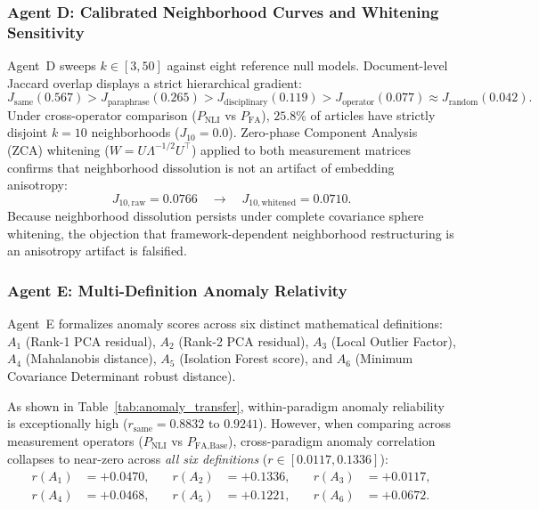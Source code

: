 \subsubsection{Agent D: Calibrated Neighborhood Curves and Whitening Sensitivity}

Agent~D sweeps $k \in [3, 50]$ against eight reference null models. Document-level Jaccard overlap displays a strict hierarchical gradient:
\begin{equation}
    J_{\text{same}} (0.567) > J_{\text{paraphrase}} (0.265) > J_{\text{disciplinary}} (0.119) > J_{\text{operator}} (0.077) \approx J_{\text{random}} (0.042).
\end{equation}
Under cross-operator comparison ($P_{\text{NLI}}$ vs $P_{\text{FA}}$), $25.8\%$ of articles have strictly disjoint $k=10$ neighborhoods ($J_{10} = 0.0$).
Zero-phase Component Analysis (ZCA) whitening ($W = U \Lambda^{-1/2} U^\top$) applied to both measurement matrices confirms that neighborhood dissolution is not an artifact of embedding anisotropy:
\begin{equation}
    J_{10,\text{raw}} = \mathbf{0.0766} \quad \longrightarrow \quad J_{10,\text{whitened}} = \mathbf{0.0710}.
\end{equation}
Because neighborhood dissolution persists under complete covariance sphere whitening, the objection that framework-dependent neighborhood restructuring is an anisotropy artifact is falsified.

\subsubsection{Agent E: Multi-Definition Anomaly Relativity}

Agent~E formalizes anomaly scores across six distinct mathematical definitions: $A_1$ (Rank-1 PCA residual), $A_2$ (Rank-2 PCA residual), $A_3$ (Local Outlier Factor), $A_4$ (Mahalanobis distance), $A_5$ (Isolation Forest score), and $A_6$ (Minimum Covariance Determinant robust distance).

As shown in Table~\ref{tab:anomaly_transfer}, within-paradigm anomaly reliability is exceptionally high ($r_{\text{same}} = \mathbf{0.8832}$ to $\mathbf{0.9241}$). However, when comparing across measurement operators ($P_{\text{NLI}}$ vs $P_{\text{FA,Base}}$), cross-paradigm anomaly correlation collapses to near-zero across \emph{all six definitions} ($r \in [0.0117, 0.1336]$):
\begin{equation}
\begin{aligned}
    r(A_1) &= +0.0470, \quad & r(A_2) &= +0.1336, \quad & r(A_3) &= +0.0117, \\
    r(A_4) &= +0.0468, \quad & r(A_5) &= +0.1221, \quad & r(A_6) &= +0.0672.
\end{aligned}
\end{equation}

